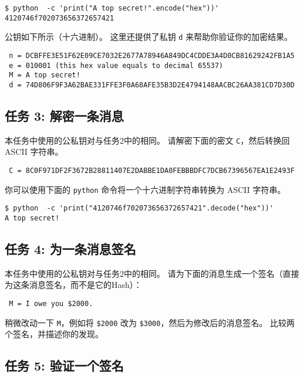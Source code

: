 \begin{lstlisting}
$ python  -c 'print("A top secret!".encode("hex"))'
4120746f702073656372657421
\end{lstlisting}


公钥如下所示（十六进制）。
这里还提供了私钥 \texttt{d} 来帮助你验证你的加密结果。

\begin{lstlisting}
 n = DCBFFE3E51F62E09CE7032E2677A78946A849DC4CDDE3A4D0CB81629242FB1A5
 e = 010001 (this hex value equals to decimal 65537)
 M = A top secret!
 d = 74D806F9F3A62BAE331FFE3F0A68AFE35B3D2E4794148AACBC26AA381CD7D30D
\end{lstlisting}



\subsection{任务 3: 解密一条消息}

本任务中使用的公私钥对与任务2中的相同。
请解密下面的密文 \texttt{C}，然后转换回 ASCII 字符串。

\begin{lstlisting}
 C = 8C0F971DF2F3672B28811407E2DABBE1DA0FEBBBDFC7DCB67396567EA1E2493F
\end{lstlisting}


你可以使用下面的 \texttt{python} 命令将一个十六进制字符串转换为 ASCII 字符串。
\begin{lstlisting}
$ python  -c 'print("4120746f702073656372657421".decode("hex"))'
A top secret!
\end{lstlisting}



\subsection{任务 4: 为一条消息签名}

本任务中使用的公私钥对与任务2中的相同。
请为下面的消息生成一个签名（直接为这条消息签名，而不是它的Hash）：

\begin{lstlisting}
 M = I owe you $2000.
\end{lstlisting}

稍微改动一下 \texttt{M}，例如将 \texttt{\$2000} 改为 \texttt{\$3000}，然后为修改后的消息签名。
比较两个签名，并描述你的发现。


\subsection{任务 5: 验证一个签名}

